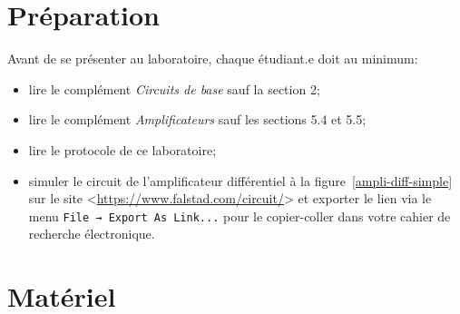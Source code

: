 \documentclass[canadien,12pt,oneside,letterpaper]{article}
\begin{document}



\section{Préparation}

\noindent Avant de se présenter au laboratoire, chaque étudiant.e doit au minimum:
\vspace{1ex}
\begin{itemize}
\item lire le complément \textit{Circuits de base} sauf la section 2;
\item lire le complément \textit{Amplificateurs} sauf les sections 5.4 et 5.5;
\item lire le protocole de ce laboratoire;
\item simuler le circuit de l'amplificateur différentiel à la figure~\ref{ampli-diff-simple} sur le site <\url{https://www.falstad.com/circuit/}> et exporter le lien via le menu \texttt{File → Export As Link...} pour le copier-coller dans votre cahier de recherche électronique.
\end{itemize}

\section{Matériel}
\end{document}

